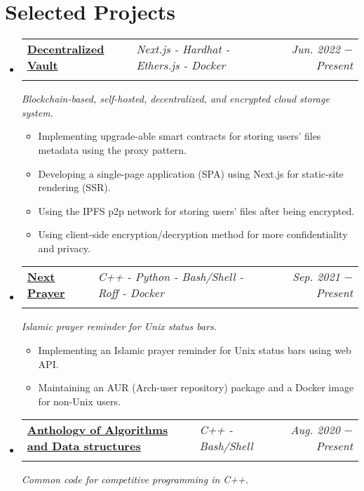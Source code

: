 \documentclass[letterpaper, 11pt]{article}
\makeatletter
\newcommand{\subexperience}[1] {
\item\small
  {#1}
  \vspace{-2pt}
}
\newcommand{\project}[6] {
  \vspace{-1pt}\item
  \begin{tabular*}{0.97\textwidth}[t]{ll@{\extracolsep{\fill}}r}
    #1 \href{#4}{\textbf{\color{RoyalBlue}#2}} \textbar{ } & \textit{#5} & \textit{\small #3} \\
    \vspace{-10pt}
  \end{tabular*}
  \textit{\small #6}
  \vspace{-8pt}
}
\newcommand{\subproject}[1] {
\item\small
  {#1}
  \vspace{-2pt}
}
\makeatother
\begin{document}

\section{Selected Projects}
\begin{itemize}[leftmargin=*]
  \project
  {\faIcon{cloud}}
  {Decentralized Vault}{Jun. 2022 $-$ Present}
  {https://devault.vercel.app/}{Next.js - Hardhat - Ethers.js - Docker}
  {Blockchain-based, self-hosted, decentralized, and encrypted cloud storage system.}

  \begin{itemize}
    \subproject
    {Implementing upgrade-able smart contracts for storing users' files metadata using the proxy pattern.}
    \subproject
    {Developing a single-page application (SPA) using Next.js for static-site rendering (SSR).}
    \subproject
    {Using the IPFS p2p network for storing users' files after being encrypted.}
    \subproject
    {Using client-side encryption/decryption method for more confidentiality and privacy.}
  \end{itemize}\vspace{-4pt}

  \project
  {\faIcon{mosque}}
  {Next Prayer}{Sep. 2021 $-$ Present}
  {https://github.com/AbdeltwabMF/nxprayer}{C++ - Python - Bash/Shell - Roff - Docker}
  {Islamic prayer reminder for Unix status bars.}

  \begin{itemize}
    \subproject
    {Implementing an Islamic prayer reminder for Unix status bars using web API.}
    \subproject
    {Maintaining an AUR (Arch-user repository) package and a Docker image for non-Unix users.}
  \end{itemize}\vspace{-4pt}

  \project
  {\faIcon{laptop-code}}
  {Anthology of Algorithms and Data structures}{Aug. 2020 $-$ Present}  {https://github.com/AbdeltwabMF/Anthology-of-Algorithms-and-Data-structures}{C++ - Bash/Shell}
  {Common code for competitive programming in C++.}


\end{itemize}
\end{document}
